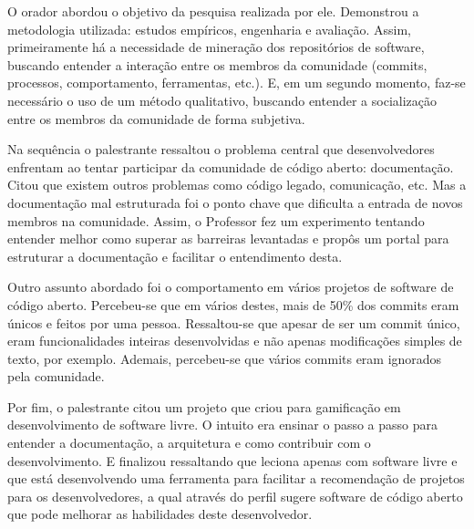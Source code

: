 O orador abordou o objetivo da pesquisa realizada por ele. Demonstrou a metodologia utilizada: estudos empíricos, engenharia e avaliação. Assim, primeiramente há a necessidade de mineração dos repositórios de software, buscando entender a interação entre os membros da comunidade (commits, processos, comportamento, ferramentas, etc.). E, em um segundo momento, faz-se necessário o uso de um método qualitativo, buscando entender a socialização entre os membros da comunidade de forma subjetiva.

Na sequência o palestrante ressaltou o problema central que desenvolvedores enfrentam ao tentar participar da comunidade de código aberto: documentação. Citou que existem outros problemas como código legado, comunicação, etc. Mas a documentação mal estruturada foi o ponto chave que dificulta a entrada de novos membros na comunidade. Assim, o Professor fez um experimento tentando entender melhor como superar as barreiras levantadas e propôs um portal para estruturar a documentação e facilitar o entendimento desta.

Outro assunto abordado foi o comportamento em vários projetos de software de código aberto. Percebeu-se que em vários destes, mais de 50\% dos commits eram únicos e feitos por uma pessoa. Ressaltou-se que apesar de ser um commit único, eram funcionalidades inteiras desenvolvidas e não apenas modificações simples de texto, por exemplo. Ademais, percebeu-se que vários commits eram ignorados pela comunidade.

Por fim, o palestrante citou um projeto que criou para gamificação em desenvolvimento de software livre. O intuito era ensinar o passo a passo para entender a documentação, a arquitetura e como contribuir com o desenvolvimento. E finalizou ressaltando que leciona apenas com software livre e que está desenvolvendo uma ferramenta para facilitar a recomendação de projetos para os desenvolvedores, a qual através do perfil sugere software de código aberto que pode melhorar as habilidades deste desenvolvedor.